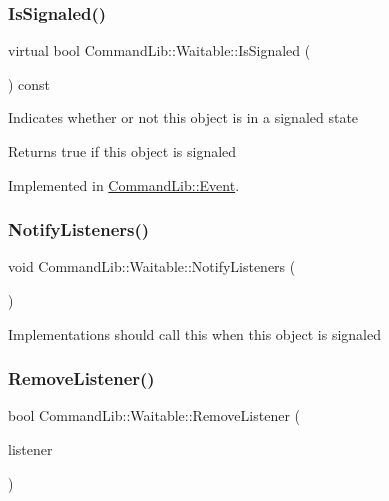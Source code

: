 \subsubsection{\texorpdfstring{Is\+Signaled()}{IsSignaled()}}
{\footnotesize\ttfamily virtual bool Command\+Lib\+::\+Waitable\+::\+Is\+Signaled (\begin{DoxyParamCaption}{ }\end{DoxyParamCaption}) const\hspace{0.3cm}{\ttfamily [pure virtual]}}



Indicates whether or not this object is in a signaled state

\begin{DoxyReturn}{Returns}
true if this object is signaled
\end{DoxyReturn}


Implemented in \mbox{\hyperlink{class_command_lib_1_1_event_a943dcf40e6b9fa09df19cd3fa870788e}{Command\+Lib\+::\+Event}}.

\mbox{\label{class_command_lib_1_1_waitable_a3ea1f52b7ee42671a441b531e4d3cd34}} 
\subsubsection{\texorpdfstring{Notify\+Listeners()}{NotifyListeners()}}
{\footnotesize\ttfamily void Command\+Lib\+::\+Waitable\+::\+Notify\+Listeners (\begin{DoxyParamCaption}{ }\end{DoxyParamCaption})\hspace{0.3cm}{\ttfamily [protected]}}



Implementations should call this when this object is signaled

\mbox{\label{class_command_lib_1_1_waitable_a4fcc6b508053a565565bc4fb591b7cf9}} 
\subsubsection{\texorpdfstring{Remove\+Listener()}{RemoveListener()}}
{\footnotesize\ttfamily bool Command\+Lib\+::\+Waitable\+::\+Remove\+Listener (\begin{DoxyParamCaption}\item[{std\+::shared\+\_\+ptr$<$ \mbox{\hyperlink{class_command_lib_1_1_wait_monitor}{Wait\+Monitor}} $>$}]{listener }\end{DoxyParamCaption})}



